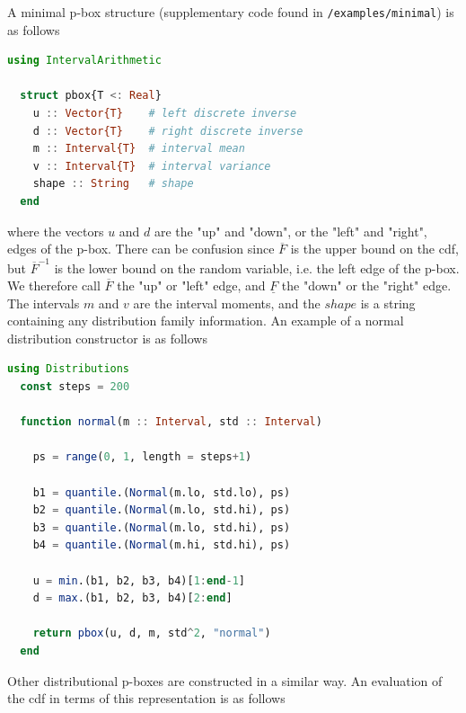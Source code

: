 \documentclass{juliacon}
\begin{document}
A minimal p-box structure (supplementary code found in \texttt{/examples/minimal}) is as follows
\begin{lstlisting}[language = Julia]
  using IntervalArithmetic

  struct pbox{T <: Real}
    u :: Vector{T}    # left discrete inverse
    d :: Vector{T}    # right discrete inverse
    m :: Interval{T}  # interval mean
    v :: Interval{T}  # interval variance
    shape :: String   # shape
  end
\end{lstlisting}
\noindent where the vectors $u$ and $d$ are the "up" and "down", or the "left" and "right", edges of the p-box. There can be confusion since $\overline{F}$ is the upper bound on the cdf, but $\overline{F}^{-1}$ is the lower bound on the random variable, i.e. the left edge of the p-box. We therefore call $\overline{F}$ the "up" or "left" edge, and $\underline{F}$ the "down" or the "right" edge. The intervals $m$ and $v$ are the interval moments, and the $shape$ is a string containing any distribution family information. An example of a normal distribution constructor is as follows
\begin{lstlisting}[language = Julia]
  using Distributions
  const steps = 200

  function normal(m :: Interval, std :: Interval)

    ps = range(0, 1, length = steps+1)

    b1 = quantile.(Normal(m.lo, std.lo), ps)
    b2 = quantile.(Normal(m.lo, std.hi), ps)
    b3 = quantile.(Normal(m.lo, std.hi), ps)
    b4 = quantile.(Normal(m.hi, std.hi), ps)

    u = min.(b1, b2, b3, b4)[1:end-1]
    d = max.(b1, b2, b3, b4)[2:end]

    return pbox(u, d, m, std^2, "normal")
  end
\end{lstlisting}
Other distributional p-boxes are constructed in a similar way. An evaluation of the cdf in terms of this representation is as follows
\end{document}
